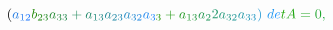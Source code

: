 \documentclass[12pt]{article}
\begin{document}
\begin{displaymath}
{(} \mathcolor[RGB]{30,120,225}{a} _ { \mathcolor[RGB]{30,120,240}{1} \mathcolor[RGB]{30,120,255}{2} } \mathcolor[RGB]{30,135,0}{b} _ { \mathcolor[RGB]{30,135,15}{2} \mathcolor[RGB]{30,135,30}{3} } \mathcolor[RGB]{30,135,45}{a} _ { \mathcolor[RGB]{30,135,60}{3} \mathcolor[RGB]{30,135,75}{3} } \mathcolor[RGB]{30,135,90}{+} \mathcolor[RGB]{30,135,105}{a} _ { \mathcolor[RGB]{30,135,120}{1} \mathcolor[RGB]{30,135,135}{3} } \mathcolor[RGB]{30,135,150}{a} _ { \mathcolor[RGB]{30,135,165}{2} \mathcolor[RGB]{30,135,180}{3} } \mathcolor[RGB]{30,135,195}{a} _ { \mathcolor[RGB]{30,135,210}{3} \mathcolor[RGB]{30,135,225}{2} } \mathcolor[RGB]{30,135,240}{a} _ { \mathcolor[RGB]{30,135,255}{3} \mathcolor[RGB]{30,150,0}{3} } \mathcolor[RGB]{30,150,15}{+} \mathcolor[RGB]{30,150,30}{a} _ { \mathcolor[RGB]{30,150,45}{1} \mathcolor[RGB]{30,150,60}{3} } \mathcolor[RGB]{30,150,75}{a} _ { \mathcolor[RGB]{30,150,90}{2} } \mathcolor[RGB]{30,150,105}{2} \mathcolor[RGB]{30,150,120}{a} _ { \mathcolor[RGB]{30,150,135}{3} \mathcolor[RGB]{30,150,150}{2} } \mathcolor[RGB]{30,150,165}{a} _ { \mathcolor[RGB]{30,150,180}{3} \mathcolor[RGB]{30,150,195}{3} } \mathcolor[RGB]{30,150,210}{)} \mathcolor[RGB]{30,150,225}{\operatorname*} { \mathcolor[RGB]{30,150,240}{d} \mathcolor[RGB]{30,150,255}{e} \mathcolor[RGB]{30,165,0}{t} } \mathcolor[RGB]{30,165,15}{A} \mathcolor[RGB]{30,165,30}{=} \mathcolor[RGB]{30,165,45}{0} \mathcolor[RGB]{30,165,60}{,} \mathcolor[RGB]{30,165,75}{\,

}
\end{displaymath}
\end{document}

